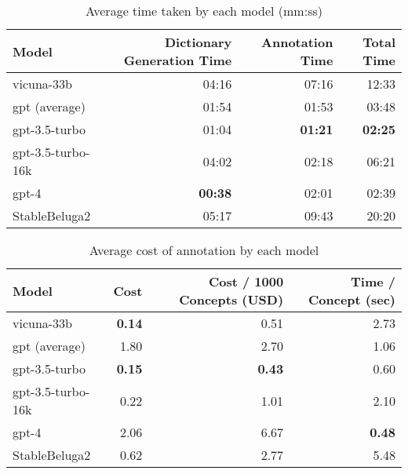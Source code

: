 \begin{table}[htpb]
  \centering
  \begin{tabular}{lrrr}
    \hline
    Model & Dictionary Generation Time & Annotation Time & Total Time \\
    \hline
    vicuna-33b & 04:16 & 07:16 & 12:33 \\
    gpt (average) & 01:54 & 01:53 & 03:48 \\
    gpt-3.5-turbo & 01:04 & \textbf{01:21} & \textbf{02:25} \\
    gpt-3.5-turbo-16k & 04:02 & 02:18 & 06:21 \\
    gpt-4 & \textbf{00:38} & 02:01 & 02:39 \\
    StableBeluga2 & 05:17 & 09:43 & 20:20 \\
    \hline
  \end{tabular}
  \caption[Average time taken]{Average time taken by each model (mm:ss)}
  \label{tab:open-time}
\end{table}

\begin{table}[htpb]
  \centering
  \begin{tabular}{lrrr}
    \hline
    Model & Cost & Cost / 1000 Concepts (USD) & Time / Concept (sec) \\
    \hline
    vicuna-33b & \textbf{0.14} & 0.51 & 2.73 \\
    gpt (average) & 1.80 & 2.70 & 1.06 \\
    gpt-3.5-turbo & \textbf{0.15} & \textbf{0.43} & 0.60 \\
    gpt-3.5-turbo-16k & 0.22 & 1.01 & 2.10 \\
    gpt-4 & 2.06 & 6.67 & \textbf{0.48} \\
    StableBeluga2 & 0.62 & 2.77 & 5.48 \\
    \hline
  \end{tabular}
  \caption[Cost Analysis]{Average cost of annotation by each model}
  \label{tab:open-cost}
\end{table}
